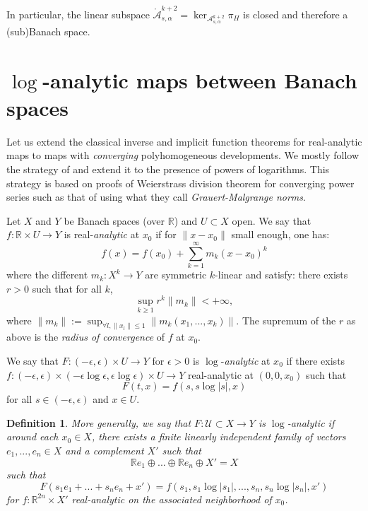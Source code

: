 \documentclass[12pt]{article}
\newtheorem{defn}[thm]{Definition}
\newcommand{\calA}{{\mathcal A}}
\begin{document}
        In particular, the linear subspace $\mathring{\calA}_{s,\alpha}^{k+2} = \ker_{\calA_{s,\alpha}^{k+2}} \pi_H$ is closed and therefore a (sub)Banach space.

\section{$\log$-analytic maps between Banach spaces}
  
    Let us extend the classical inverse and implicit function theorems for real-analytic maps to maps with \emph{converging} polyhomogeneous developments. We mostly follow the strategy of \cite{bt} and extend it to the presence of powers of logarithms. This strategy is based on proofs of Weierstrass division theorem for converging power series such as that of \cite{lmr} using what they call \emph{Grauert-Malgrange norms}.

    Let $X$ and $Y$ be Banach spaces (over $\mathbb{R}$) and $U\subset X$ open. We say that $f: \mathbb{R}\times U\to Y$ is real-\emph{analytic} at $x_0$ if for $\|x-x_0\|$ small enough, one has:
    $$ f(x) = f(x_0)+ \sum_{k=1}^\infty m_k(x-x_0)^k $$
    where the different $m_k: X^k\to Y$ are symmetric $k$-linear and satisfy: there exists $r>0$ such that for all $k$,
    $$ \sup_{k\geqslant 1} r^k\|m_k\| <+\infty, $$
    where $\|m_k\| := \sup_{\forall l,\|x_l\|\leqslant 1} \|m_k(x_1,...,x_k)\|$. The supremum of the $r$ as above is the \emph{radius of convergence} of $f$ at $x_0$.
    
    We say that $F : (-\epsilon,\epsilon)\times U \to Y$ for $\epsilon>0$ is $\log$-\emph{analytic} at $x_0$ if there exists $f: (-\epsilon,\epsilon)\times (-\epsilon\log \epsilon,\epsilon\log \epsilon) \times U \to Y$ real-analytic at $(0,0,x_0)$ such that
    $$F(t,x) = f(s,s\log |s|,x)$$ 
    for all $ s\in (-\epsilon,\epsilon) $ and $x\in U$. 
    
    
    \begin{defn}
    More generally, we say that $F:\mathcal{U}\subset X\to Y$ is $\log$-analytic if around each $x_0\in X$, there exists a finite linearly independent family of vectors $e_1,...,e_n\in X$ and a complement $X'$ such that $$\mathbb{R}e_1\oplus...\oplus \mathbb{R}e_n\oplus X'=X$$ such that 
    $$F(s_1e_1+...+s_ne_n+x') = f(s_1,s_1\log|s_1|,...,s_n,s_n\log|s_n|,x') $$
    for $f : \mathbb{R}^{2n}\times X'$ real-analytic on the associated neighborhood of $x_0$.
    \end{defn}
    
\end{document}
